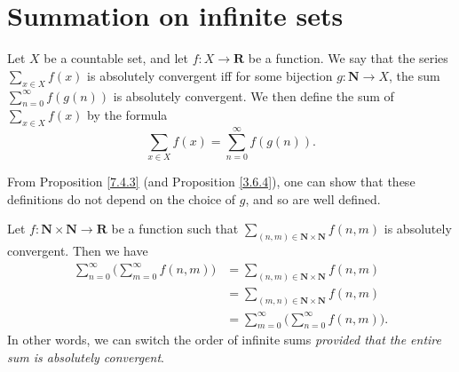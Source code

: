 \section{Summation on infinite sets}\label{sec 8.2}

\begin{definition}\label{8.2.1}
Let \(X\) be a countable set, and let \(f : X \to \mathbf{R}\) be a function.
We say that the series \(\sum_{x \in X} f(x)\) is absolutely convergent iff for some bijection \(g : \mathbf{N} \to X\), the sum \(\sum_{n = 0}^\infty f(g(n))\) is absolutely convergent.
We then define the sum of \(\sum_{x \in X} f(x)\) by the formula
\[
    \sum_{x \in X} f(x) = \sum_{n = 0}^\infty f(g(n)).
\]
\end{definition}

\begin{note}
From Proposition \ref{7.4.3} (and Proposition \ref{3.6.4}), one can show that these definitions do not depend on the choice of \(g\), and so are well defined.
\end{note}

\begin{theorem}\label{8.2.2}
Let \(f : \mathbf{N} \times \mathbf{N} \to \mathbf{R}\) be a function such that \(\sum_{(n, m) \in \mathbf{N} \times \mathbf{N}} f(n, m)\) is absolutely convergent.
Then we have
\begin{align*}
\sum_{n = 0}^\infty \bigg(\sum_{m = 0}^\infty f(n, m)\bigg) &= \sum_{(n, m) \in \mathbf{N} \times \mathbf{N}} f(n, m) \\
&= \sum_{(m, n) \in \mathbf{N} \times \mathbf{N}} f(n, m) \\
&= \sum_{m = 0}^\infty \bigg(\sum_{n = 0}^\infty f(n, m)\bigg).
\end{align*}
In other words, we can switch the order of infinite sums \emph{provided that the entire sum is absolutely convergent}.
\end{theorem}


